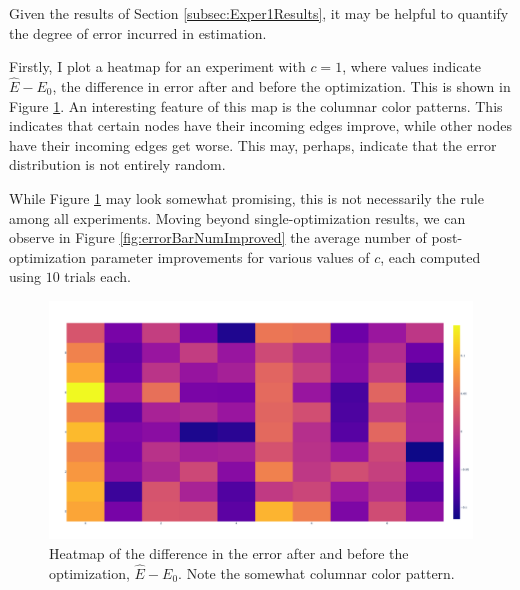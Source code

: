 \documentclass{article}
\theoremstyle{definition}
\begin{document}
Given the results of Section \ref{subsec:Exper1Results}, it may be helpful to quantify the degree of error incurred in estimation.

Firstly, I plot a heatmap for an experiment with $c=1$, where values indicate $\hat{E} - E_0$, the difference in error after and before the optimization. This is shown in Figure \ref{fig:heatmapImprovements}. An interesting feature of this map is the columnar color patterns. This indicates that certain nodes have their incoming edges improve, while other nodes have their incoming edges get worse. This may, perhaps, indicate that the error distribution is not entirely random.

While Figure \ref{fig:heatmapImprovements} may look somewhat promising, this is not necessarily the rule among all experiments. Moving beyond single-optimization results, we can observe in Figure \ref{fig:errorBarNumImproved} the average number of post-optimization parameter improvements for various values of $c$, each computed using $10$ trials each.

\newpage

\begin{figure}[hbt!]
    \par
    \begin{center}
    \caption{Heatmap of the difference in the error after and before the optimization, $\hat{E} - E_0$. Note the somewhat columnar color pattern.}
    \label{fig:heatmapImprovements}
    \includegraphics[scale=0.10]{Figures/heatmap_improved_params.png}
    \end{center}
    \par
    \vspace{-0.25in}
    \medskip
\end{figure}

\vspace{-0.5in}
\end{document}
